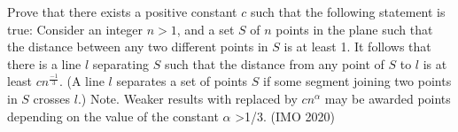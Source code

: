 %
%
%
%
%
%
\iffalse
\item Prove that there exists a positive constant $c$ such that the following statement is true:
Consider an integer $n> 1$, and a set $S$ of $n$ points in the plane such that the distance between
any
 two different points in $S$ is at least 1. It follows that there is a 
line $l$ separating $S$ such that the distance from any point of $S$ to $l$ is 
at least $cn^\frac{-1}{3}$.
(A line $l$ separates a set of points $S$ if some segment joining two points in $S$ crosses $l$.)
Note. Weaker results with  replaced by $cn^\alpha$ may be awarded points depending on the value of the constant $ \alpha$ \textgreater1/3.
   \hfill(IMO 2020)
